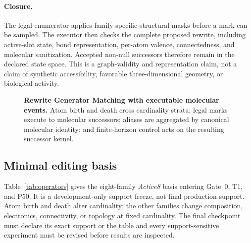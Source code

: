 \paragraph{Closure.}
The legal enumerator applies family-specific structural masks before a mark can
be sampled. The executor then checks the complete proposed rewrite, including
active-slot state, bond representation, per-atom valence, connectedness, and
molecular sanitization. Accepted non-null successors therefore remain in the
declared state space. This is a graph-validity and representation claim, not a
claim of synthetic accessibility, favorable three-dimensional geometry, or
biological activity.

\begin{figure}[t]
  \centering
  
  \caption{\textbf{Rewrite Generator Matching with executable molecular
  events.} Atom birth and death cross cardinality strata; legal marks execute
  to molecular successors; aliases are aggregated by canonical molecular
  identity; and finite-horizon control acts on the resulting successor kernel.}
  \label{fig:framework}
\end{figure}

\subsection{Minimal editing basis}
\label{sec:operator-basis}

Table~\ref{tab:operators} gives the eight-family \emph{Active8} basis entering
Gate~0, T1, and P50. It is a development-only support freeze, not final
production support. Atom birth and death alter cardinality; the other families
change composition, electronics, connectivity, or topology at fixed
cardinality. The final checkpoint must declare its exact support or the table
and every support-sensitive experiment must be revised before results are
inspected.

